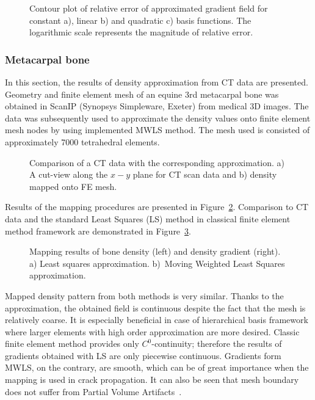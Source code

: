 \documentclass[11pt]{acmeArticle}
\numberwithin{equation}{section}
\begin{document}
\begin{figure}[h!]
	\centering
		\def\svgwidth{14cm}
	
	\caption{Contour plot of relative error of approximated gradient field for constant a), linear b) and quadratic c) basis functions. The logarithmic scale represents the magnitude of relative error.}
	\label{fig:prism_error}
\end{figure}
\subsubsection{Metacarpal bone}
In this section, the results of density approximation from CT data are presented. Geometry and finite element mesh of an equine 3rd metacarpal bone was obtained in ScanIP (Synopsys Simpleware, Exeter) from medical 3D images. The data was subsequently used to approximate the density values onto finite element mesh nodes by using implemented MWLS method. 
The mesh used is consisted of approximately 7000 tetrahedral elements.
\begin{figure}
	\centering
	\def\svgwidth{10cm}
	
	\caption{Comparison of a CT data with the corresponding approximation. a) A cut-view along the $x-y$ plane for CT scan data and b) density mapped onto FE mesh.}
	\label{fig:mwlsmapping_cross}
\end{figure}
Results of the mapping procedures are presented in Figure~\ref{fig:mwlsmapping_cross}. Comparison to CT data and the standard Least Squares (LS) method in classical finite element method framework are demonstrated in Figure~\ref{fig:mwlsmappingcomparisons}.
\begin{figure}[h!]
	\centering
		\def\svgwidth{12cm}
		
	\caption{Mapping results of bone density (left) and density gradient (right). a) Least squares approximation. b)~Moving Weighted Least Squares approximation.}
	\label{fig:mwlsmappingcomparisons}
\end{figure}
Mapped density pattern from both methods is very similar. 
Thanks to the approximation, the obtained field is continuous despite the fact that the mesh is relatively coarse. 
It is especially beneficial in case of hierarchical basis framework where larger elements with high order approximation are more desired. 
Classic finite element method provides only ${C^0}$-continuity; therefore the results of gradients obtained with LS are only piecewise continuous. 
Gradients form MWLS, on the contrary, are smooth, which can be of great importance when the mapping is used in crack propagation.
It can also be seen that mesh boundary does not suffer from Partial Volume Artifacts~\citep{adams2009quantitative}.
\end{document}
